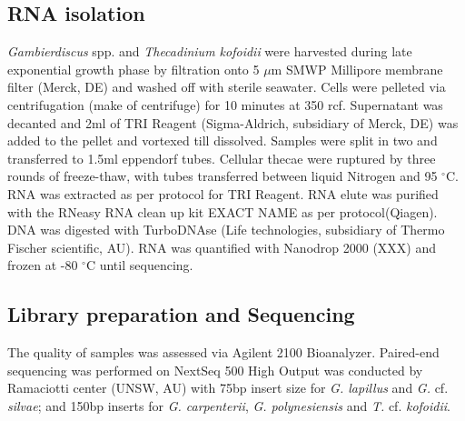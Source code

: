 \documentclass[12pt]{article}
\begin{document}
 \subsection*{RNA isolation}
\emph{Gambierdiscus} spp. and \emph{Thecadinium kofoidii} were harvested during late exponential growth phase by filtration onto 5 $\mu$m SMWP Millipore membrane filter (Merck, DE) and washed off with sterile seawater. 
Cells were pelleted via centrifugation (make of centrifuge) for 10 minutes at 350 rcf. 
Supernatant was decanted and 2ml of TRI Reagent (Sigma-Aldrich, subsidiary of Merck, DE) was added to the pellet and vortexed till dissolved. 
Samples were split in two and transferred to 1.5ml eppendorf tubes. 
Cellular thecae were ruptured by three rounds of freeze-thaw, with tubes transferred between liquid Nitrogen and 95 $^{\circ}$C. 
RNA was extracted as per protocol for TRI Reagent. 
RNA elute was purified with the RNeasy RNA clean up kit EXACT NAME as per protocol(Qiagen). 
DNA was digested with TurboDNAse (Life technologies, subsidiary of Thermo Fischer scientific, AU). 
RNA was quantified with Nanodrop 2000 (XXX) and frozen at -80 $^{\circ}$C until sequencing.
 
\subsection*{Library preparation and Sequencing}
The quality of samples was assessed via Agilent 2100 Bioanalyzer. 
Paired-end sequencing was performed on NextSeq 500 High Output was conducted by Ramaciotti center (UNSW, AU) with 75bp insert size for \emph{G. lapillus} and \emph{G.} cf. \emph{silvae}; and 150bp inserts for \emph{G. carpenterii}, \emph{G. polynesiensis} and \emph{T.} cf. \emph{kofoidii}.


\end{document}
